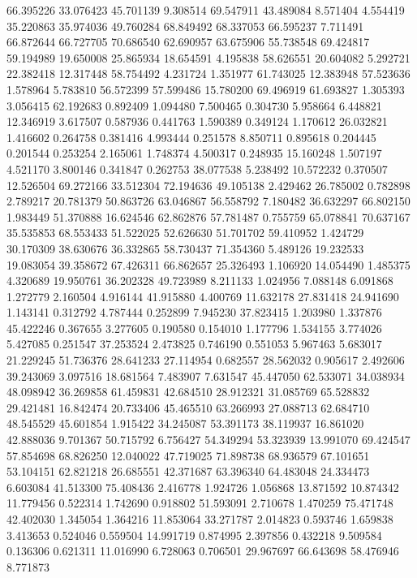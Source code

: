 66.395226
33.076423
45.701139
9.308514
69.547911
43.489084
8.571404
4.554419
35.220863
35.974036
49.760284
68.849492
68.337053
66.595237
7.711491
66.872644
66.727705
70.686540
62.690957
63.675906
55.738548
69.424817
59.194989
19.650008
25.865934
18.654591
4.195838
58.626551
20.604082
5.292721
22.382418
12.317448
58.754492
4.231724
1.351977
61.743025
12.383948
57.523636
1.578964
5.783810
56.572399
57.599486
15.780200
69.496919
61.693827
1.305393
3.056415
62.192683
0.892409
1.094480
7.500465
0.304730
5.958664
6.448821
12.346919
3.617507
0.587936
0.441763
1.590389
0.349124
1.170612
26.032821
1.416602
0.264758
0.381416
4.993444
0.251578
8.850711
0.895618
0.204445
0.201544
0.253254
2.165061
1.748374
4.500317
0.248935
15.160248
1.507197
4.521170
3.800146
0.341847
0.262753
38.077538
5.238492
10.572232
0.370507
12.526504
69.272166
33.512304
72.194636
49.105138
2.429462
26.785002
0.782898
2.789217
20.781379
50.863726
63.046867
56.558792
7.180482
36.632297
66.802150
1.983449
51.370888
16.624546
62.862876
57.781487
0.755759
65.078841
70.637167
35.535853
68.553433
51.522025
52.626630
51.701702
59.410952
1.424729
30.170309
38.630676
36.332865
58.730437
71.354360
5.489126
19.232533
19.083054
39.358672
67.426311
66.862657
25.326493
1.106920
14.054490
1.485375
4.320689
19.950761
36.202328
49.723989
8.211133
1.024956
7.088148
6.091868
1.272779
2.160504
4.916144
41.915880
4.400769
11.632178
27.831418
24.941690
1.143141
0.312792
4.787444
0.252899
7.945230
37.823415
1.203980
1.337876
45.422246
0.367655
3.277605
0.190580
0.154010
1.177796
1.534155
3.774026
5.427085
0.251547
37.253524
2.473825
0.746190
0.551053
5.967463
5.683017
21.229245
51.736376
28.641233
27.114954
0.682557
28.562032
0.905617
2.492606
39.243069
3.097516
18.681564
7.483907
7.631547
45.447050
62.533071
34.038934
48.098942
36.269858
61.459831
42.684510
28.912321
31.085769
65.528832
29.421481
16.842474
20.733406
45.465510
63.266993
27.088713
62.684710
48.545529
45.601854
1.915422
34.245087
53.391173
38.119937
16.861020
42.888036
9.701367
50.715792
6.756427
54.349294
53.323939
13.991070
69.424547
57.854698
68.826250
12.040022
47.719025
71.898738
68.936579
67.101651
53.104151
62.821218
26.685551
42.371687
63.396340
64.483048
24.334473
6.603084
41.513300
75.408436
2.416778
1.924726
1.056868
13.871592
10.874342
11.779456
0.522314
1.742690
0.918802
51.593091
2.710678
1.470259
75.471748
42.402030
1.345054
1.364216
11.853064
33.271787
2.014823
0.593746
1.659838
3.413653
0.524046
0.559504
14.991719
0.874995
2.397856
0.432218
9.509584
0.136306
0.621311
11.016990
6.728063
0.706501
29.967697
66.643698
58.476946
8.771873
